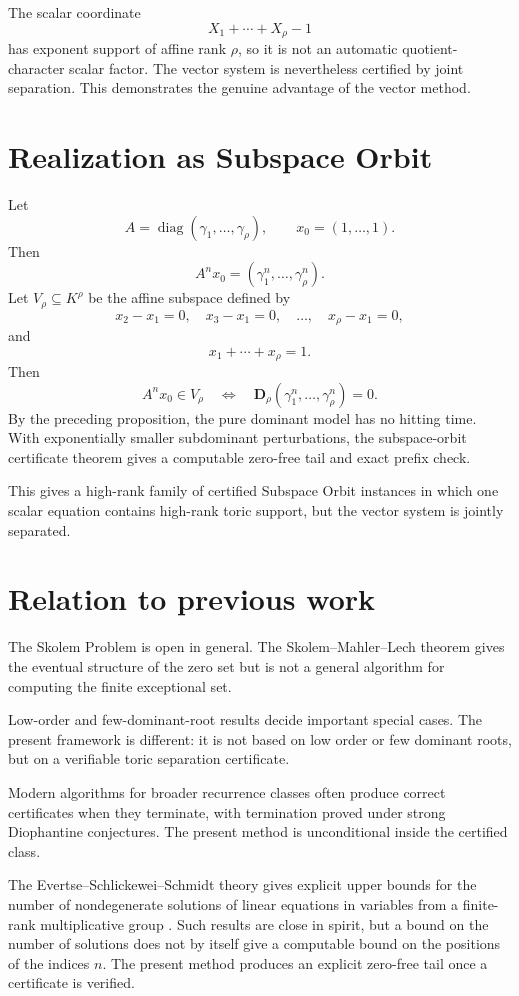 \documentclass[11pt]{article}
\begin{document}
The scalar coordinate
\[
X_1+\cdots+X_\rho-1
\]
has exponent support of affine rank \(\rho\), so it is not an automatic quotient-character scalar factor. The vector system is nevertheless certified by joint separation. This demonstrates the genuine advantage of the vector method.

\section{Realization as Subspace Orbit}

Let
\[
A=\operatorname{diag}(\gamma_1,\ldots,\gamma_\rho),
\qquad
x_0=(1,\ldots,1).
\]
Then
\[
A^nx_0=(\gamma_1^n,\ldots,\gamma_\rho^n).
\]
Let \(V_\rho\subseteq K^\rho\) be the affine subspace defined by
\[
x_2-x_1=0,\quad
x_3-x_1=0,\quad\ldots,\quad x_\rho-x_1=0,
\]
and
\[
x_1+\cdots+x_\rho=1.
\]
Then
\[
A^nx_0\in V_\rho
\quad\Longleftrightarrow\quad
\mathbf D_\rho(\gamma_1^n,\ldots,\gamma_\rho^n)=0.
\]
By the preceding proposition, the pure dominant model has no hitting time. With exponentially smaller subdominant perturbations, the subspace-orbit certificate theorem gives a computable zero-free tail and exact prefix check.

This gives a high-rank family of certified Subspace Orbit instances in which one scalar equation contains high-rank toric support, but the vector system is jointly separated.

\section{Relation to previous work}

The Skolem Problem is open in general. The Skolem--Mahler--Lech theorem gives the eventual structure of the zero set but is not a general algorithm for computing the finite exceptional set.

Low-order and few-dominant-root results decide important special cases. The present framework is different: it is not based on low order or few dominant roots, but on a verifiable toric separation certificate.

Modern algorithms for broader recurrence classes often produce correct certificates when they terminate, with termination proved under strong Diophantine conjectures. The present method is unconditional inside the certified class.

The Evertse--Schlickewei--Schmidt theory gives explicit upper bounds for the number of nondegenerate solutions of linear equations in variables from a finite-rank multiplicative group \cite{ESS}. Such results are close in spirit, but a bound on the number of solutions does not by itself give a computable bound on the positions of the indices \(n\). The present method produces an explicit zero-free tail once a certificate is verified.
\end{document}
